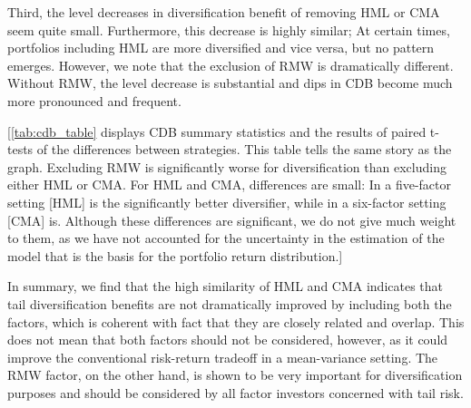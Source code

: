 Third, the level decreases in diversification benefit of removing HML or CMA seem quite small. Furthermore, this decrease is highly similar; At certain times, portfolios including HML are more diversified and vice versa, but no pattern emerges. However, we note that the exclusion of RMW is dramatically different. Without RMW, the level decrease is substantial and dips in CDB become much more pronounced and frequent. 

[\autoref{tab:cdb_table} displays CDB summary statistics and the results of paired t-tests of the differences between strategies. This table tells the same story as the graph. Excluding RMW is significantly worse for diversification than excluding either HML or CMA. For HML and CMA, differences are small: In a five-factor setting [HML] is the significantly better diversifier, while in a six-factor setting [CMA] is. Although these differences are significant, we do not give much weight to them, as we have not accounted for the uncertainty in the estimation of the model that is the basis for the portfolio return distribution.]

In summary, we find that the high similarity of HML and CMA indicates that tail diversification benefits are not dramatically improved by including both the factors, which is coherent with fact that they are closely related and overlap. This does not mean that both factors should not be considered, however, as it could improve the conventional risk-return tradeoff in a mean-variance setting. The RMW factor, on the other hand, is shown to be very important for diversification purposes and should be considered by all factor investors concerned with tail risk.







